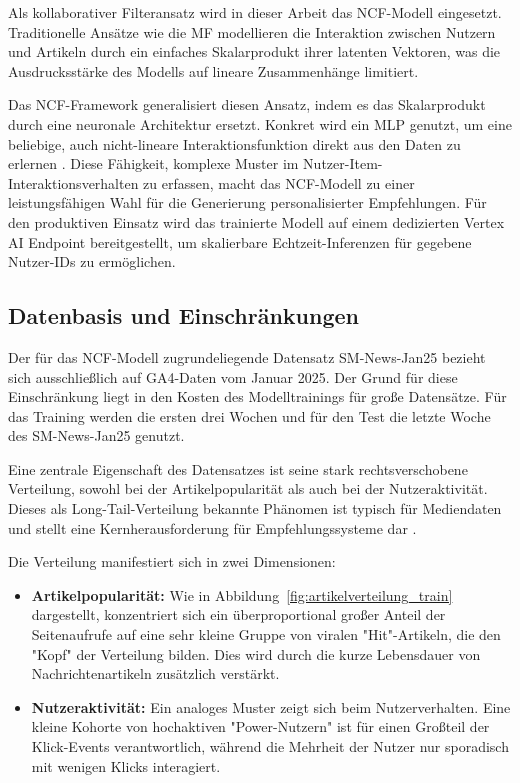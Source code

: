 Als kollaborativer Filteransatz wird in dieser Arbeit das \ac{NCF}-Modell eingesetzt. 
Traditionelle Ansätze wie die \ac{MF} modellieren die Interaktion zwischen Nutzern und Artikeln durch ein einfaches Skalarprodukt ihrer latenten Vektoren,
was die Ausdrucksstärke des Modells auf lineare Zusammenhänge limitiert.

Das NCF-Framework generalisiert diesen Ansatz, indem es das Skalarprodukt durch eine neuronale Architektur ersetzt. 
Konkret wird ein \ac{MLP} genutzt, um eine beliebige, auch nicht-lineare Interaktionsfunktion direkt aus den Daten zu erlernen \cite{he_neural_2017}. 
Diese Fähigkeit, komplexe Muster im Nutzer-Item-Interaktionsverhalten zu erfassen, macht das NCF-Modell zu einer 
leistungsfähigen Wahl für die Generierung personalisierter Empfehlungen.
Für den produktiven Einsatz wird das trainierte Modell auf einem dedizierten Vertex AI Endpoint bereitgestellt, 
um skalierbare Echtzeit-Inferenzen für gegebene Nutzer-IDs zu ermöglichen.

\subsection{Datenbasis und Einschränkungen}
\label{sec:data}
Der für das \ac{NCF}-Modell zugrundeliegende Datensatz SM-News-Jan25 bezieht sich ausschließlich auf \ac{GA4}-Daten vom Januar 2025.
Der Grund für diese Einschränkung liegt in den Kosten des Modelltrainings für große Datensätze. Für das Training werden die ersten drei Wochen 
und für den Test die letzte Woche des SM-News-Jan25 genutzt. 

Eine zentrale Eigenschaft des Datensatzes ist seine stark rechtsverschobene Verteilung, 
sowohl bei der Artikelpopularität als auch bei der Nutzeraktivität. Dieses als Long-Tail-Verteilung 
bekannte Phänomen ist typisch für Mediendaten und stellt eine Kernherausforderung für Empfehlungssysteme dar \cite{wu_personalized_2022, raza_news_2020}.



Die Verteilung manifestiert sich in zwei Dimensionen:

\begin{itemize}
    \item 
    \textbf{Artikelpopularität:} Wie in Abbildung~\ref{fig:artikelverteilung_train} dargestellt,\newline 
    konzentriert sich ein 
    überproportional großer Anteil der Seitenaufrufe auf eine sehr kleine Gruppe von viralen "Hit"-Artikeln, die den "Kopf" der Verteilung bilden. 
    Dies wird durch die kurze Lebensdauer von Nachrichtenartikeln zusätzlich verstärkt.
    \item \textbf{Nutzeraktivität:} Ein analoges Muster zeigt sich beim Nutzerverhalten. 
    Eine kleine Kohorte von hochaktiven "Power-Nutzern" ist für einen Großteil der Klick-Events verantwortlich, während die Mehrheit der Nutzer nur 
    sporadisch mit wenigen Klicks interagiert.
\end{itemize}

